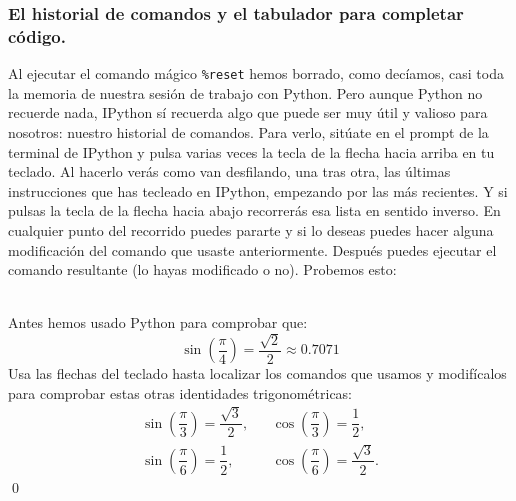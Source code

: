 \documentclass[10pt,a4paper]{article}\usepackage[]{graphicx}\usepackage[]{color}
\begin{document}
\subsubsection*{El historial de comandos y el tabulador para completar código.}
\label{tut02:subsubsec:historialComandosTabuladorCompletarCodigo}

Al ejecutar el comando mágico \verb#%reset#
hemos borrado, como decíamos, casi toda la memoria de nuestra sesión de trabajo con Python. Pero aunque Python no recuerde nada, IPython sí recuerda algo que puede ser muy útil y valioso para nosotros: nuestro {\sf historial de comandos}.  Para verlo, sitúate en el prompt de la terminal de IPython y pulsa varias veces la tecla de la flecha hacia arriba en tu teclado. Al hacerlo verás como van desfilando, una tras otra, las últimas instrucciones que has tecleado en IPython, empezando por las más recientes.
Y si pulsas la tecla de la flecha hacia abajo recorrerás esa lista en sentido inverso. En cualquier punto del recorrido puedes pararte y si lo deseas puedes hacer alguna modificación del comando que usaste anteriormente. Después puedes ejecutar el comando resultante (lo hayas modificado o no). Probemos esto:
\begin{ejercicio}
\label{tut02:ejercicio07}
\quad\\
Antes hemos usado Python para comprobar que:
$$\sin\left(\dfrac{\pi}{4}\right) = \dfrac{\sqrt{2}}{2}\approx 0.7071$$
Usa las flechas del teclado hasta localizar los comandos que usamos y modifícalos para comprobar estas otras identidades trigonométricas:
\[
\begin{array}{lll}
\sin\left(\dfrac{\pi}{3}\right) = \dfrac{\sqrt{3}}{2},&&
\cos\left(\dfrac{\pi}{3}\right) = \dfrac{1}{2},\\[3mm]
\sin\left(\dfrac{\pi}{6}\right) = \dfrac{1}{2},&&
\cos\left(\dfrac{\pi}{6}\right) = \dfrac{\sqrt{3}}{2}.
\end{array}
\]
\qed
\end{ejercicio}
\end{document}
